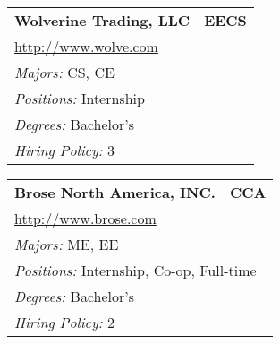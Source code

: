 \documentclass[twoside]{article}
\begin{document}
\begin{center}
\begin{multicols}{3}
\begin{FlushLeft}
\begin{minipage}{.9\columnwidth}
\end{minipage}
 
\begin{minipage}{.9\columnwidth}\begin{tabularx}{.95\columnwidth}{Xr}
                 {\Large\bf Wolverine Trading, LLC} & {\Large\bf EECS}\\
    \multicolumn{2}{p{.95\columnwidth}}{\url{http://www.wolve.com}}\\
    \multicolumn{2}{p{.95\columnwidth}}{\emph{Majors:} CS, CE}\\
    \multicolumn{2}{p{.95\columnwidth}}{\emph{Positions:} Internship}\\
    \multicolumn{2}{p{.95\columnwidth}}{\emph{Degrees:} Bachelor's}\\
    \multicolumn{2}{p{.95\columnwidth}}{\emph{Hiring Policy:} 3}\\
    \end{tabularx}
    
\end{minipage}
 
\begin{minipage}{.9\columnwidth}\begin{tabularx}{.95\columnwidth}{Xr}
                 {\Large\bf Brose North America, INC.} & {\Large\bf CCA}\\
    \multicolumn{2}{p{.95\columnwidth}}{\url{http://www.brose.com}}\\
    \multicolumn{2}{p{.95\columnwidth}}{\emph{Majors:} ME, EE}\\
    \multicolumn{2}{p{.95\columnwidth}}{\emph{Positions:} Internship, Co-op, Full-time}\\
    \multicolumn{2}{p{.95\columnwidth}}{\emph{Degrees:} Bachelor's}\\
    \multicolumn{2}{p{.95\columnwidth}}{\emph{Hiring Policy:} 2}\\
    \end{tabularx}
    
\end{minipage}
 
\end{FlushLeft}
    \end{multicols}\end{center}
    \newpage{}
\end{document}
